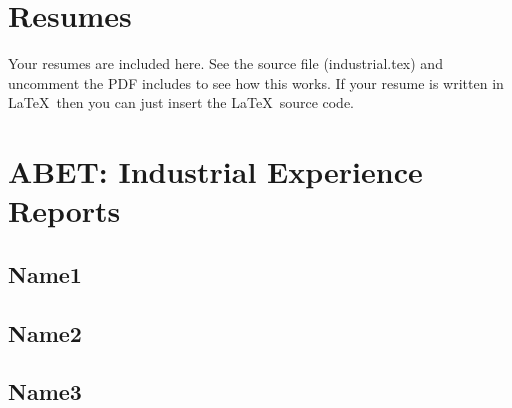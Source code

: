 


\section{Resumes}

Your resumes are included here.  See the source file (industrial.tex) and uncomment the PDF includes to see how this works.  If your resume is written in \LaTeX\ then you can just insert the \LaTeX\ source code.


%     
%     
%     

\section{ABET:  Industrial Experience Reports}

\subsection{Name1}

% 

\subsection{Name2}

% 

\subsection{Name3}

% 


